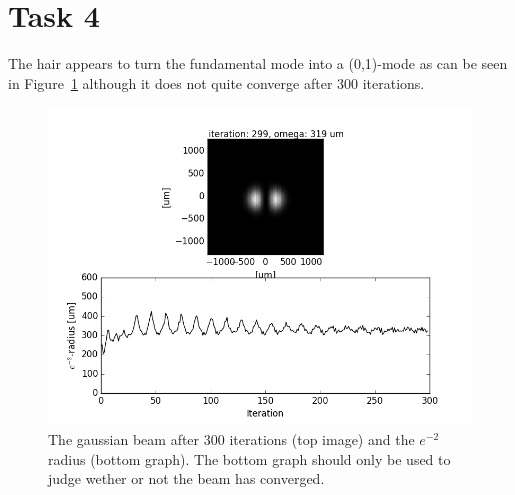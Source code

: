 \documentclass[12pt,a4paper]{article}
\begin{document}
\section{Task 4}\label{sec:4}
The hair appears to turn the fundamental mode into a (0,1)-mode as can be seen in Figure~\ref{fig:task4} although it does not quite converge after 300 iterations.
\begin{figure}[ht!]
  \centering
  \includegraphics[width=\textwidth]{4_gauss_1_0.png}
  \caption{The gaussian beam after 300 iterations (top image) and the $e^{-2}$ radius (bottom graph). The bottom graph should only be used to judge wether or not the beam has converged.}
  \label{fig:task4}
\end{figure}
\end{document}

